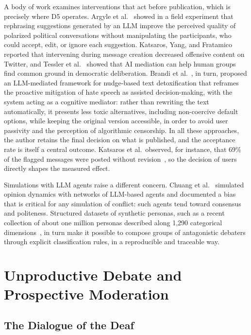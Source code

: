 \documentclass[conference]{IEEEtran}
\begin{document}
A body of work examines interventions that act before publication, which is
precisely where D5 operates. Argyle et al.~\cite{argyle2023leveraging} showed
in a field experiment that rephrasing suggestions generated by an LLM improve
the perceived quality of polarized political conversations without
manipulating the participants, who could accept, edit, or ignore each
suggestion. Katsaros, Yang, and Fratamico~\cite{katsaros2022reconsidering}
reported that intervening during message creation decreased offensive content
on Twitter, and Tessler et al.~\cite{tessler2024ai} showed that AI mediation
can help human groups find common ground in democratic deliberation. Brandi et
al.~\cite{brandi2026nudge}, in turn, proposed an LLM-mediated framework for
nudge-based text detoxification that reframes the proactive mitigation of hate
speech as assisted decision-making, with the system acting as a cognitive
mediator: rather than rewriting the text automatically, it presents less
toxic alternatives, including non-coercive default options, while keeping the
original version accessible, in order to avoid user passivity and the
perception of algorithmic censorship. In all these approaches, the author
retains the final decision on what is published, and the acceptance rate is
itself a central outcome. Katsaros et al.\
observed, for instance, that 69\% of the flagged messages were posted without
revision~\cite{katsaros2022reconsidering}, so the decision of users directly
shapes the measured effect.

Simulations with LLM agents raise a different concern. Chuang et
al.~\cite{chuang2023simulating} simulated opinion dynamics with networks of
LLM-based agents and documented a bias that is critical for any simulation of
conflict: such agents tend toward consensus and politeness. Structured
datasets of synthetic personas, such as a recent collection of about one
million personas described along 1,290 categorical
dimensions~\cite{li2026matraix}, in turn make it possible to compose groups of
antagonistic debaters through explicit classification rules, in a
reproducible and traceable way.

\section{Unproductive Debate and Prospective Moderation}\label{sec:foundations}

\subsection{The Dialogue of the Deaf}\label{sec:angenot}
\end{document}
